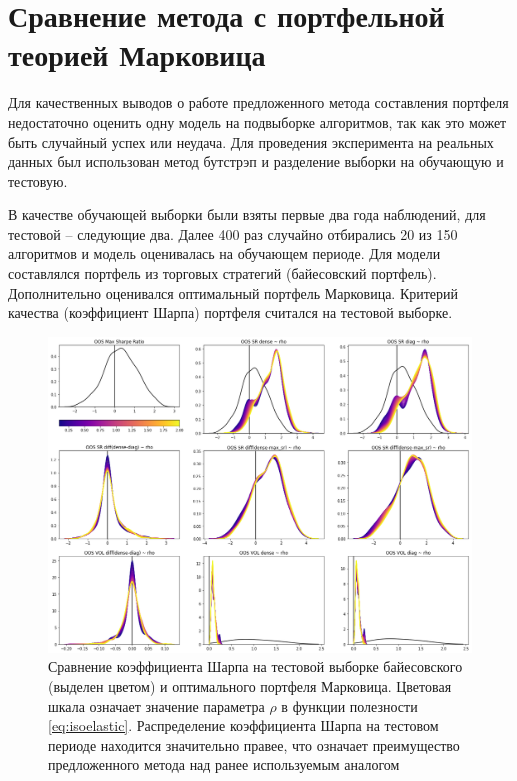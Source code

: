 \section{Сравнение метода с портфельной теорией Марковица}
Для качественных выводов о работе предложенного метода составления портфеля недостаточно оценить одну модель на подвыборке алгоритмов, так как это может быть случайный успех или неудача. Для проведения эксперимента на реальных данных был использован метод бутстрэп \citep{grimshaw1995} и разделение выборки на обучающую и тестовую. 

В качестве обучающей выборки были взяты первые два года наблюдений, для тестовой -- следующие два. Далее 400 раз случайно отбирались 20 из 150 алгоритмов и модель оценивалась на обучающем периоде. Для модели составлялся портфель из торговых стратегий (байесовский портфель). Дополнительно оценивался оптимальный портфель Марковица. Критерий качества (коэффициент Шарпа) портфеля считался на тестовой выборке.

\begin{figure}[t]
	\centering
	\includegraphics[width=\linewidth]{Thesis/images/performance}
	\caption{Сравнение коэффициента Шарпа на тестовой выборке байесовского (выделен цветом) и оптимального портфеля Марковица. Цветовая шкала означает значение параметра $\rho$ в функции полезности \eqref{eq:isoelastic}. Распределение коэффициента Шарпа на тестовом периоде находится значительно правее, что означает преимущество предложенного метода над ранее используемым аналогом}
	\label{fig:performance}
\end{figure}

